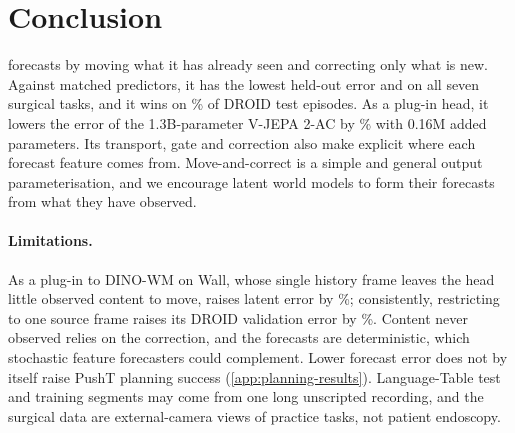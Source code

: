 \section{Conclusion}
\label{sec:conclusion}
\ours{} forecasts by moving what it has already seen and correcting only what is new.
%
Against matched predictors, it has the lowest held-out error  and on all seven
surgical tasks, and it wins on \wmWinDirect\% of DROID test episodes.
%
As a plug-in head, it lowers the error of the 1.3B-parameter V-JEPA 2-AC by \vjepaMSERed\% with 0.16M added parameters.
%
Its transport, gate and correction also make explicit where each forecast feature comes from.
%
Move-and-correct is a simple and general output parameterisation, and we encourage latent world models to form their
forecasts from what they have observed.

\paragraph{Limitations.} As a plug-in to DINO-WM on Wall, whose single history frame leaves the head little observed
content to move, \ours{} raises latent error by \dinowmWallErrInc\%; consistently, restricting \ours{} to one source frame
raises its DROID validation error by \ablsone\%.
%
Content never observed relies on the correction, and the forecasts are deterministic, which stochastic feature
forecasters could complement.
%
Lower forecast error does not by itself raise PushT planning success (\cref{app:planning-results}).
%
Language-Table test and training segments may come from one long unscripted recording, and the surgical data are
external-camera views of practice tasks, not patient endoscopy.
